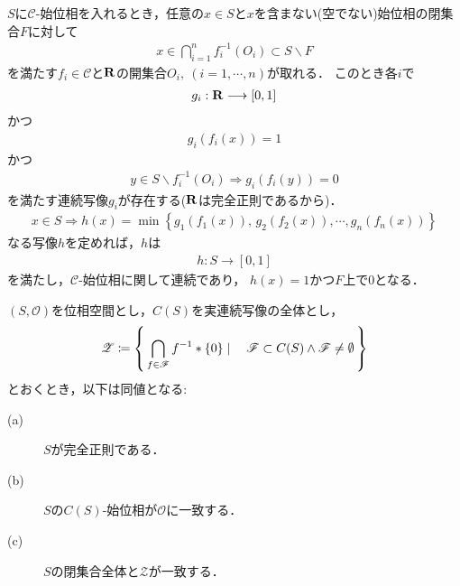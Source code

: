 	\begin{prf}
		$S$に$\mathscr{C}$-始位相を入れるとき，任意の$x \in S$と$x$を含まない(空でない)始位相の閉集合$F$に対して
		\begin{align}
			x \in \bigcap_{i=1}^n f_i^{-1}(O_i) \subset S \backslash F
		\end{align}
		を満たす$f_i \in \mathscr{C}$と$\mathbf{R}$の開集合$O_i,\ (i=1,\cdots,n)$が取れる．
		このとき各$i$で
		\begin{align}
			g_i:\mathbf{R} \longrightarrow [0,1]
		\end{align}
		かつ
		\begin{align}
			g_i(f_i(x)) = 1
		\end{align}
		かつ
		\begin{align}
			y \in S \backslash f_i^{-1}(O_i)
			\Longrightarrow g_i(f_i(y)) = 0
		\end{align}
		を満たす連続写像$g_i$が存在する($\mathbf{R}$は完全正則であるから)．
		\begin{align}
			x \in S \Longrightarrow h(x) = \operatorname{min}\left\{g_1(f_1(x)),\, g_2(f_2(x)),\cdots,g_n(f_n(x))\right\}
		\end{align}
		なる写像$h$を定めれば，$h$は
		\begin{align}
			h:S \longrightarrow [0,1]
		\end{align}
		を満たし，$\mathscr{C}$-始位相に関して連続であり，
		$h(x)=1$かつ$F$上で$0$となる．
		\QED
	\end{prf}
	
	\begin{screen}
		\begin{thm}[完全正則空間の位相は実連続写像全体の始位相に一致する]
			$(S,\mathscr{O})$を位相空間とし，$C(S)$を実連続写像の全体とし，
			\begin{align}
				\mathscr{Z} \coloneqq \left\{\, \bigcap_{f \in \mathscr{F}} f^{-1}\ast\{0\} \mid \quad \mathscr{F} \subset C(S) \wedge \mathscr{F} \neq \emptyset\, \right\}
			\end{align}
			とおくとき，以下は同値となる:
			\begin{description}
				\item[(a)] $S$が完全正則である．
				\item[(b)] $S$の$C(S)$-始位相が$\mathscr{O}$に一致する．
				\item[(c)] $S$の閉集合全体と$\mathscr{Z}$が一致する．
			\end{description}
		\end{thm}
	\end{screen}
		
